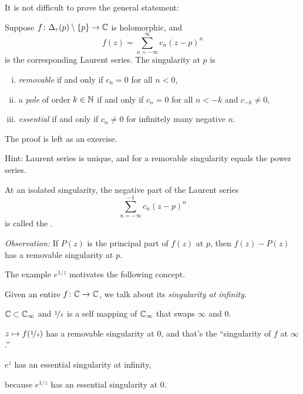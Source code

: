 \documentclass[10pt,aspectratio=169]{beamer}
\begin{document}
\begin{frame}
It is not difficult to prove the general statement:

\begin{proposition}
Suppose $f \colon \Delta_r(p) \setminus \{p\} \to {\mathbb{C}}$ is holomorphic,
and
\begin{equation*}
f(z) = \sum_{n=-\infty}^\infty c_n {(z-p)}^n
\end{equation*}
is the corresponding Laurent series.
\pause
The singularity at $p$ is
\begin{enumerate}[(i)]
\item
\emph{removable} if and only if $c_n = 0$ for all $n < 0$,
\item
\pause
a \emph{pole} of order $k \in {\mathbb{N}}$ if and only if $c_n = 0$ for all $n < -k$ and
$c_{-k}
\not= 0$,
\item
\pause
\emph{essential} if and only if $c_n \not= 0$ for infinitely many negative $n$.
\end{enumerate}
\end{proposition}

\pause

The proof is left as an exercise.

\pause
Hint: Laurent series is unique, and for a removable singularity
equals the power series.

\end{frame}

\begin{frame}

\begin{definition}
At an isolated singularity, the negative part of the Laurent series
\begin{equation*}
\sum_{n=-\infty}^{-1} c_n {(z-p)}^n 
\end{equation*}
is called the \emph{}.
\end{definition}

\pause

\emph{Observation:}
If $P(z)$ is the principal part of $f(z)$ at $p$, then
$f(z)-P(z)$ has a removable singularity at $p$.
\end{frame}

\begin{frame}
The example $e^{1/z}$ motivates the following concept.

\medskip
\pause

Given an entire $f \colon {\mathbb{C}} \to {\mathbb{C}}$, we talk about its
\emph{singularity at infinity.}

\medskip
\pause

${\mathbb{C}} \subset {\mathbb{C}}_{\infty}$ and $\nicefrac{1}{z}$ is a self mapping of
${\mathbb{C}}_{\infty}$ that swaps $\infty$ and $0$.

\medskip
\pause

$z \mapsto f(\nicefrac{1}{z})$ has a removable singularity
at $0$, and that's the ``singularity of $f$ at $\infty$.''

\medskip
\pause

$e^z$ has an essential singularity at infinity,

because
$e^{1/z}$ has an essential singularity at $0$.

\end{frame}
\end{document}
